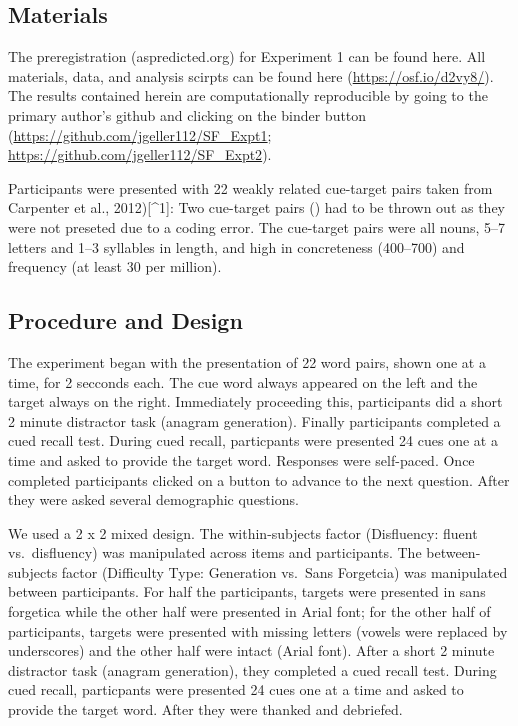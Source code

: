 \documentclass[doc]{apa6}
\begin{document}
\hypertarget{materials}{%
\subsection{Materials}\label{materials}}

The preregistration (aspredicted.org) for Experiment 1 can be found here. All materials, data, and analysis scirpts can be found here (\url{https://osf.io/d2vy8/}). The results contained herein are computationally reproducible by going to the primary author's github and clicking on the binder button (\url{https://github.com/jgeller112/SF_Expt1}; \url{https://github.com/jgeller112/SF_Expt2}).

Participants were presented with 22 weakly related cue-target pairs taken from Carpenter et al., 2012){[}\^{}1{]}: Two cue-target pairs () had to be thrown out as they were not preseted due to a coding error. The cue-target pairs were all nouns, 5--7 letters and 1--3 syllables in length, and high in concreteness (400--700) and frequency (at least 30 per million).

\hypertarget{procedure-and-design}{%
\subsection{Procedure and Design}\label{procedure-and-design}}

The experiment began with the presentation of 22 word pairs, shown one at a time, for 2 secconds each. The cue word always appeared on the left and the target always on the right. Immediately proceeding this, participants did a short 2 minute distractor task (anagram generation). Finally participants completed a cued recall test. During cued recall, particpants were presented 24 cues one at a time and asked to provide the target word. Responses were self-paced. Once completed participants clicked on a button to advance to the next question. After they were asked several demographic questions.

We used a 2 x 2 mixed design. The within-subjects factor (Disfluency: fluent vs.~disfluency) was manipulated across items and participants. The between-subjects factor (Difficulty Type: Generation vs.~Sans Forgetcia) was manipulated between participants. For half the participants, targets were presented in sans forgetica while the other half were presented in Arial font; for the other half of participants, targets were presented with missing letters (vowels were replaced by underscores) and the other half were intact (Arial font). After a short 2 minute distractor task (anagram generation), they completed a cued recall test. During cued recall, particpants were presented 24 cues one at a time and asked to provide the target word. After they were thanked and debriefed.
\end{document}
